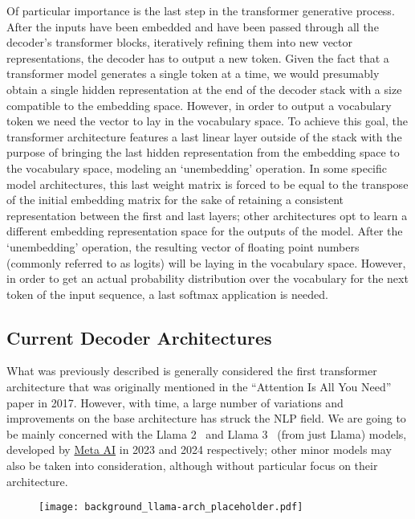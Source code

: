 Of particular importance is the last step in the transformer generative process.
After the inputs have been embedded and have been passed through all the decoder's transformer blocks, iteratively refining them into new vector representations, the decoder has to output a new token.
Given the fact that a transformer model generates a single token at a time, we would presumably obtain a single hidden representation at the end of the decoder stack with a size compatible to the embedding space.
However, in order to output a vocabulary token we need the vector to lay in the vocabulary space.
To achieve this goal, the transformer architecture features a last linear layer outside of the stack with the purpose of bringing the last hidden representation from the embedding space to the vocabulary space, modeling an `unembedding' operation.
In some specific model architectures, this last weight matrix is forced to be equal to the transpose of the initial embedding matrix for the sake of retaining a consistent representation between the first and last layers; other architectures opt to learn a different embedding representation space for the outputs of the model.
After the `unembedding' operation, the resulting vector of floating point numbers (commonly referred to as logits) will be laying in the vocabulary space.
However, in order to get an actual probability distribution over the vocabulary for the next token of the input sequence, a last softmax application is needed.

\subsection{Current Decoder Architectures}

What was previously described is generally considered the first transformer architecture that was originally mentioned in the ``Attention Is All You Need''~\cite{vaswani2017} paper in 2017.
However, with time, a large number of variations and improvements on the base architecture has struck the NLP field.
We are going to be mainly concerned with the Llama 2~\cite{touvron2023} and Llama 3~\cite{dubey2024} (from  just Llama) models, developed by \hyperref[https://ai.meta.com/]{Meta AI} in 2023 and 2024 respectively; other minor models may also be taken into consideration, although without particular focus on their architecture.

\begin{figure}[H]
    \centering
    \texttt{[image: background\_llama-arch\_placeholder.pdf]}
    \caption{}
    \label{fig:background_llama-arch}
\end{figure}

